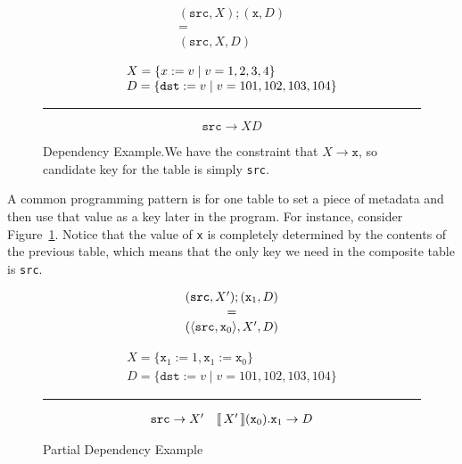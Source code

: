 \begin{figure}[ptb]
  \begin{minipage}{.33\columnwidth}
  \[\begin{array}{c}
      (\texttt{src}, X);
      (\texttt{x}, D)
      \\ = \\
      (\texttt{src}, X, D)
    \end{array}\]
\end{minipage}\hfill\vrule\hfill\begin{minipage}{.66\columnwidth}
  \[\begin{array}l
      X = \{x:=v \mid v = 1,2,3,4\}\\
      D = \{\texttt{dst} := v \mid v = 101,102,103,104\} \\
    \end{array}
  \]
  \hrule
  \[\texttt{src}\longrightarrow XD\]
\end{minipage}

\caption{Dependency Example.We have the constraint that
  $X \longrightarrow \texttt{x}$, so candidate key for the table is
  simply \texttt{src}.}
  \label{fig:dependency-ex}
\end{figure}

A common programming pattern is for one table to set a piece of
metadata and then use that value as a key later in the program. For
instance, consider Figure~\ref{fig:dependency-ex}. Notice that the
value of \texttt{x} is completely determined by the contents of the
previous table, which means that the only key we need in the composite
table is \texttt{src}. 

\begin{figure}
  \begin{minipage}{0.33\columnwidth}
  \[\begin{array}c
      (\texttt{src}, X');(\texttt{x}_1,D)
      \\ = \\
      (\langle\texttt{src},\texttt{x}_0\rangle, X', D)
    \end{array}
  \]
\end{minipage}\hfill \vline \hfill\begin{minipage}{0.66\columnwidth}
  \[\begin{array}{l}
      X = \{\texttt{x}_1:=1, \texttt{x}_1:=\texttt{x}_0\}\\
      D = \{\texttt{dst} := v \mid v = 101,102,103,104\}
    \end{array}
  \]
  \hrule\[\begin{array}{cc}
      \texttt{src} \to X'
      & \llbracket\,X'\,\rrbracket(\texttt{x}_0).\texttt{x}_1 \to D
    \end{array}\]
\end{minipage}
  \caption{Partial Dependency Example}
  \label{fig:partial-depend-ex}      
\end{figure}

